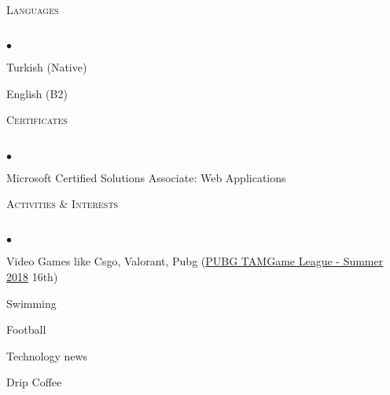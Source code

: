 \documentclass[11pt]{article}
\newcommand{\lineunder}{\vspace*{-8pt} \\ \hspace*{-18pt} \hrulefill \\}
\newcommand{\header}[1]{{\hspace*{-15pt}\vspace*{6pt} \textsc{#1}} \vspace*{-6pt} \lineunder}
\newenvironment{achievements}
{
  \begin{list}{$\bullet$}{\topsep 0pt \itemsep -2pt}}{\vspace*{4pt}\end{list}
}
\begin{document}

\header{ Languages}
\begin{achievements}
  \item Turkish (Native)
  \item English (B2)
\end{achievements}


\header{ Certificates}
\begin{achievements}
  \item Microsoft Certified Solutions Associate: Web Applications
\end{achievements}


\header{ Activities \& Interests}
\begin{achievements}
  \item Video Games like Csgo, Valorant, Pubg (\href{https://liquipedia.net/pubg/PUBG_TAMGame_League/2018/Summer}{PUBG TAMGame League - Summer 2018} 16th)
  \item Swimming
  \item Football
  \item Technology news
  \item Drip Coffee
\end{achievements}
\end{document}
